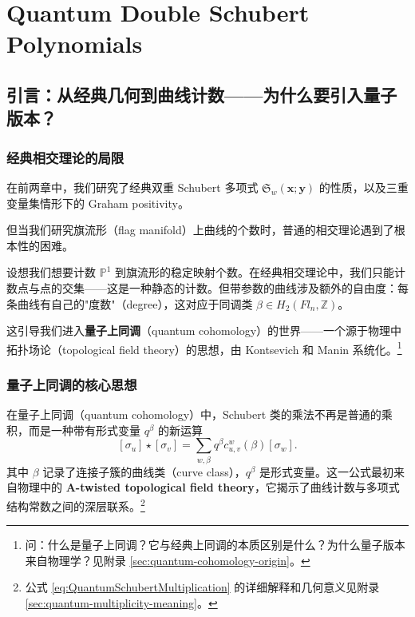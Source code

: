 
\chapter{Quantum Double Schubert Polynomials}
\label{chap:QuantumDouble}

\section{引言：从经典几何到曲线计数——为什么要引入量子版本？}
\label{sec:QuantumMotivation}

\subsection{经典相交理论的局限}

在前两章中，我们研究了经典双重 Schubert 多项式 $\mathfrak{S}_w(\mathbf{x}; \mathbf{y})$ 的性质，以及三重变量集情形下的 Graham positivity。

但当我们研究旗流形（flag manifold）上曲线的个数时，普通的相交理论遇到了根本性的困难。

设想我们想要计数 $\mathbb{P}^1$ 到旗流形的稳定映射个数。在经典相交理论中，我们只能计数点与点的交集——这是一种静态的计数。但带参数的曲线涉及额外的自由度：每条曲线有自己的"度数"（degree），这对应于同调类 $\beta \in H_2(Fl_n, \mathbb{Z})$。

这引导我们进入\textbf{量子上同调}（quantum cohomology）的世界——一个源于物理中拓扑场论（topological field theory）的思想，由 Kontsevich 和 Manin 系统化。\footnote{问：什么是量子上同调？它与经典上同调的本质区别是什么？为什么量子版本来自物理学？见附录 \cref{sec:quantum-cohomology-origin}。}

\subsection{量子上同调的核心思想}

在量子上同调（quantum cohomology）中，Schubert 类的乘法不再是普通的乘积，而是一种带有形式变量 $q^\beta$ 的新运算
\[
[\sigma_u] \star [\sigma_v] = \sum_{w,\beta} q^{\beta} c^w_{u,v}(\beta) [\sigma_w].
\label{eq:QuantumSchubertMultiplication}
\]
其中 $\beta$ 记录了连接子簇的曲线类（curve class），$q^{\beta}$ 是形式变量。这一公式最初来自物理中的 \textbf{A-twisted topological field theory}，它揭示了曲线计数与多项式结构常数之间的深层联系。\footnote{公式 \eqref{eq:QuantumSchubertMultiplication} 的详细解释和几何意义见附录 \cref{sec:quantum-multiplicity-meaning}。}

